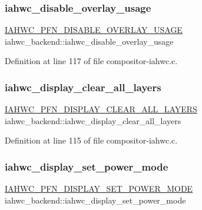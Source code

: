 \subsubsection{\texorpdfstring{iahwc\+\_\+disable\+\_\+overlay\+\_\+usage}{iahwc\_disable\_overlay\_usage}}
{\footnotesize\ttfamily \mbox{\hyperlink{iahwc_8h_af4834e97f88b6d3621d46d3ae1886795}{I\+A\+H\+W\+C\+\_\+\+P\+F\+N\+\_\+\+D\+I\+S\+A\+B\+L\+E\+\_\+\+O\+V\+E\+R\+L\+A\+Y\+\_\+\+U\+S\+A\+GE}} iahwc\+\_\+backend\+::iahwc\+\_\+disable\+\_\+overlay\+\_\+usage}



Definition at line 117 of file compositor-\/iahwc.\+c.

\mbox{\label{structiahwc__backend_a646d3bce546d9b5c350e72ae15e26873}} 
\subsubsection{\texorpdfstring{iahwc\+\_\+display\+\_\+clear\+\_\+all\+\_\+layers}{iahwc\_display\_clear\_all\_layers}}
{\footnotesize\ttfamily \mbox{\hyperlink{iahwc_8h_aa17514d93b69c9a54c9d82ecf0d11a62}{I\+A\+H\+W\+C\+\_\+\+P\+F\+N\+\_\+\+D\+I\+S\+P\+L\+A\+Y\+\_\+\+C\+L\+E\+A\+R\+\_\+\+A\+L\+L\+\_\+\+L\+A\+Y\+E\+RS}} iahwc\+\_\+backend\+::iahwc\+\_\+display\+\_\+clear\+\_\+all\+\_\+layers}



Definition at line 115 of file compositor-\/iahwc.\+c.

\mbox{\label{structiahwc__backend_adf78fcd106a4edfb0192d013f7401c6e}} 
\subsubsection{\texorpdfstring{iahwc\+\_\+display\+\_\+set\+\_\+power\+\_\+mode}{iahwc\_display\_set\_power\_mode}}
{\footnotesize\ttfamily \mbox{\hyperlink{iahwc_8h_af6ed4d8004aabdfa73e634604204b186}{I\+A\+H\+W\+C\+\_\+\+P\+F\+N\+\_\+\+D\+I\+S\+P\+L\+A\+Y\+\_\+\+S\+E\+T\+\_\+\+P\+O\+W\+E\+R\+\_\+\+M\+O\+DE}} iahwc\+\_\+backend\+::iahwc\+\_\+display\+\_\+set\+\_\+power\+\_\+mode}



